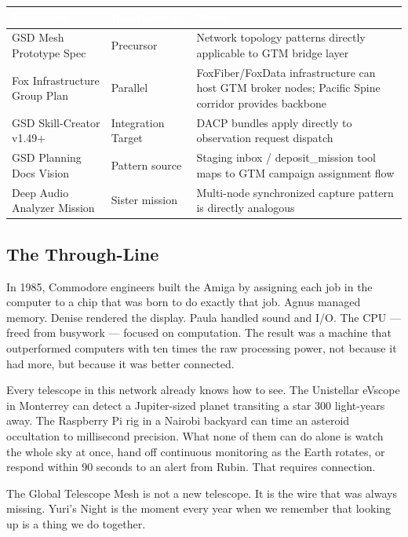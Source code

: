 \documentclass[11pt,letterpaper]{article}
\newcommand{\tableheader}[1]{\textbf{\sffamily\textcolor{white}{#1}}}
\begin{document}
\begin{center}
\begin{tabularx}{\textwidth}{L{4cm}L{4cm}X}
\toprule
{}
\tableheader{Document} & \tableheader{Relationship} & \tableheader{Notes} \\
\midrule
GSD Mesh Prototype Spec & Precursor & Network topology patterns directly applicable to GTM bridge layer \\
Fox Infrastructure Group Plan & Parallel & FoxFiber/FoxData infrastructure can host GTM broker nodes; Pacific Spine corridor provides backbone \\
GSD Skill-Creator v1.49+ & Integration Target & DACP bundles apply directly to observation request dispatch \\
GSD Planning Docs Vision & Pattern source & Staging inbox / deposit\_mission tool maps to GTM campaign assignment flow \\
Deep Audio Analyzer Mission & Sister mission & Multi-node synchronized capture pattern is directly analogous \\
\bottomrule
\end{tabularx}
\end{center}

\subsection{The Through-Line}

In 1985, Commodore engineers built the Amiga by assigning each job in the computer to a chip that was born to do exactly that job. Agnus managed memory. Denise rendered the display. Paula handled sound and I/O. The CPU --- freed from busywork --- focused on computation. The result was a machine that outperformed computers with ten times the raw processing power, not because it had more, but because it was better connected.

Every telescope in this network already knows how to see. The Unistellar eVscope in Monterrey can detect a Jupiter-sized planet transiting a star 300 light-years away. The Raspberry Pi rig in a Nairobi backyard can time an asteroid occultation to millisecond precision. What none of them can do alone is watch the whole sky at once, hand off continuous monitoring as the Earth rotates, or respond within 90 seconds to an alert from Rubin. That requires connection.

The Global Telescope Mesh is not a new telescope. It is the wire that was always missing. Yuri's Night is the moment every year when we remember that looking up is a thing we do together.
\end{document}
